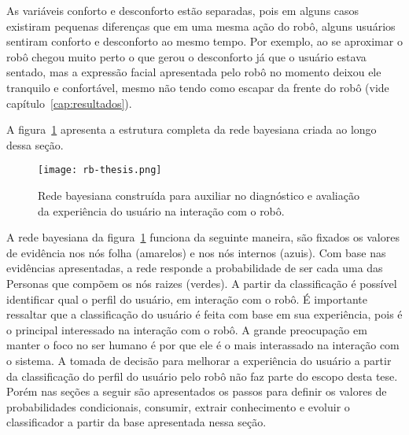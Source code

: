 As variáveis conforto e desconforto estão separadas, pois em alguns casos existiram pequenas diferenças que em uma mesma ação do robô, alguns usuários sentiram conforto e desconforto ao mesmo tempo. Por exemplo, ao se aproximar o robô chegou muito perto o que gerou o desconforto já que o usuário estava sentado, mas a expressão facial apresentada pelo robô no momento deixou ele tranquilo e confortável, mesmo não tendo como escapar da frente do robô (vide capítulo~\ref{cap:resultados}).

A figura~\ref{fig:rb} apresenta a estrutura completa da rede bayesiana criada ao longo dessa seção.

\begin{figure}[ht!]
	\centering
	\begin{minipage}{\textwidth}
		\caption{Rede bayesiana construída para auxiliar no diagnóstico e avaliação da experiência do usuário na interação com o robô.}
		\texttt{[image: rb-thesis.png]}
		\label{fig:rb}
	\end{minipage}
\end{figure}

A rede bayesiana da figura~\ref{fig:rb} funciona da seguinte maneira, são fixados os valores de evidência nos nós folha (amarelos) e nos nós internos (azuis). Com base nas evidências apresentadas, a rede responde a probabilidade de ser cada uma das Personas que compõem os nós raizes (verdes). A partir da classificação é possível identificar qual o perfil do usuário, em interação com o robô. É importante ressaltar que a classificação do usuário é feita com base em sua experiência, pois é o principal interessado na interação com o robô. A grande preocupação em manter o foco no ser humano é por que ele é o mais interassado na interação com o sistema. A tomada de decisão para melhorar a experiência do usuário a partir da classificação do perfil do usuário pelo robô não faz parte do escopo desta tese. Porém nas seções a seguir são apresentados os passos para definir os valores de probabilidades condicionais, consumir, extrair conhecimento e evoluir o classificador a partir da base apresentada nessa seção.

